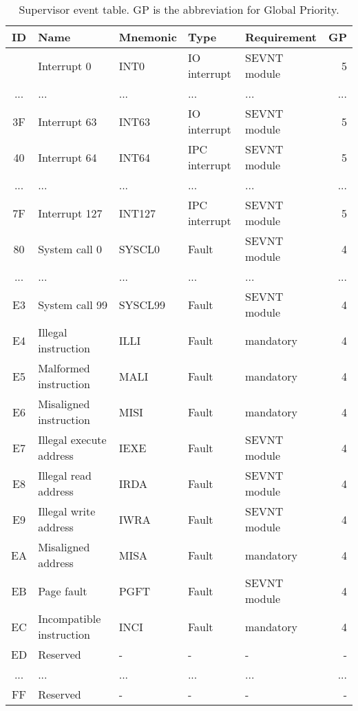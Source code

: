 \begin{table}[hbt!] %

    \begin{center}

    \begin{tabular}{|c|l|l|l|l|r|}

        \hline
        ID & Name & Mnemonic & Type & Requirement & GP \\
        \hline
        \addlinespace[10pt]
        \hline
        00 & Interrupt 0 & INT0 & IO interrupt & SEVNT module & 5 \\
        \hline
        ... & ... & ... & ... & ... & ... \\
        \hline
        3F & Interrupt 63 & INT63 & IO interrupt & SEVNT module & 5 \\
        \hline
        40 & Interrupt 64 & INT64 & IPC interrupt & SEVNT module & 5 \\
        \hline
        ... & ... & ... & ... & ... & ... \\
        \hline
        7F & Interrupt 127 & INT127 & IPC interrupt & SEVNT module & 5 \\
        \hline
        80 & System call 0 & SYSCL0 & Fault & SEVNT module & 4 \\
        \hline
        ... & ... & ... & ... & ... & ... \\
        \hline
        E3 & System call 99 & SYSCL99 & Fault & SEVNT module & 4 \\
        \hline
        E4 & Illegal instruction & ILLI & Fault & mandatory & 4 \\
        \hline
        E5 & Malformed instruction & MALI & Fault & mandatory & 4 \\
        \hline
        E6 & Misaligned instruction & MISI & Fault & mandatory & 4 \\
        \hline
        E7 & Illegal execute address & IEXE & Fault & SEVNT module & 4 \\
        \hline
        E8 & Illegal read address & IRDA & Fault & SEVNT module & 4 \\
        \hline
        E9 & Illegal write address & IWRA & Fault & SEVNT module & 4 \\
        \hline
        EA & Misaligned address & MISA & Fault & mandatory & 4 \\
        \hline
        EB & Page fault & PGFT & Fault & SEVNT module & 4 \\
        \hline
        EC & Incompatible instruction & INCI & Fault & mandatory & 4 \\
        \hline
        ED & Reserved & - & - & - & - \\
        \hline
        ... & ... & ... & ... & ... & ... \\
        \hline
        FF & Reserved & - & - & - & - \\
        \hline

    \end{tabular}

    \caption[Supervisor event table]{Supervisor event table. GP is the abbreviation for Global Priority.}

    \end{center}

\end{table}